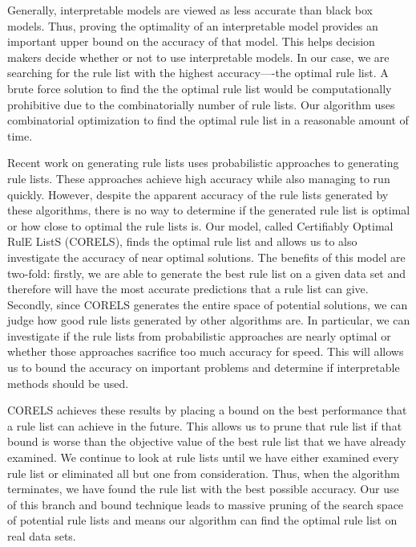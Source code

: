 Generally, interpretable models are viewed as less accurate than black box models.
Thus, proving the optimality of an interpretable model provides an important upper bound on the accuracy of that model.
This helps decision makers decide whether or not to use interpretable models.
In our case, we are searching for the rule list with the highest accuracy----the optimal rule list. 
A brute force solution to find the the optimal rule list would be computationally prohibitive due to the combinatorially number of rule lists.
Our algorithm uses combinatorial optimization to find the optimal rule list in a reasonable amount of time.

Recent work on generating rule lists \cite{LethamRuMcMa15,YangRuSe16} uses probabilistic approaches to generating rule lists.
These approaches achieve high accuracy while also managing to run quickly.
However, despite the apparent accuracy of the rule lists generated by these algorithms, there is no way to determine if the generated rule list is optimal or how close to optimal the rule lists is. 
Our model, called Certifiably Optimal RulE ListS (CORELS), finds the optimal rule list and allows us to also investigate the accuracy of near optimal solutions. 
The benefits of this model are two-fold: firstly, we are able to generate the best rule list on a given data set and therefore will have the most accurate predictions that a rule list can give.
Secondly, since CORELS generates the entire space of potential solutions, we can judge how good rule lists generated by other algorithms are. 
In particular, we can investigate if the rule lists from probabilistic approaches are nearly optimal or whether those approaches sacrifice too much accuracy for speed.
This will allows us to bound the accuracy on important problems and determine if interpretable methods should be used.

CORELS achieves these results by placing a bound on the best performance that a rule list can achieve in the future. 
This allows us to prune that rule list if that bound is worse than the objective value of the best rule list that we have already examined.
We continue to look at rule lists until we have either examined every rule list or eliminated all but one from consideration. 
Thus, when the algorithm terminates, we have found the rule list with the best possible accuracy. 
Our use of this branch and bound technique leads to massive pruning of the search space of potential rule lists and means our algorithm can find the optimal rule list on real data sets.

